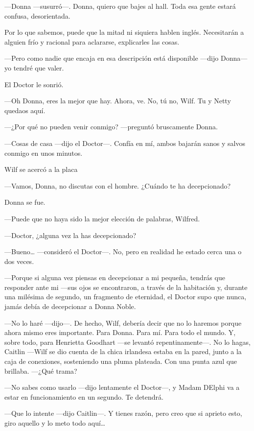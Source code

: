 ---Donna ---susurró---. Donna, quiero que bajes al hall. Toda esa gente
estará confusa, desorientada.

Por lo que sabemos, puede que la mitad ni siquiera hablen inglés.
Necesitarán a alguien frío y racional para aclararse, explicarles las
cosas.

---Pero como nadie que encaja en esa descripción está disponible ---dijo
Donna--- yo tendré que valer.

El Doctor le sonrió.

---Oh Donna, eres la mejor que hay. Ahora, ve. No, tú no, Wilf. Tu y
Netty quedaos aquí.

---¿Por qué no pueden venir conmigo? ---preguntó bruscamente Donna.

---Cosas de casa ---dijo el Doctor---. Confía en mí, ambos bajarán sanos
y salvos conmigo en unos minutos.

Wilf se acercó a la placa

---Vamos, Donna, no discutas con el hombre. ¿Cuándo te ha decepcionado?

Donna se fue.

---Puede que no haya sido la mejor elección de palabras, Wilfred.

---Doctor, ¿alguna vez la has decepcionado?

---Bueno\ldots{} ---consideró el Doctor---. No, pero en realidad he
estado cerca una o dos veces.

---Porque si alguna vez piensas en decepcionar a mi pequeña, tendrás que
responder ante mi ---sus ojos se encontraron, a través de la habitación
y, durante una milésima de segundo, un fragmento de eternidad, el Doctor
supo que nunca, jamás debía de decepcionar a Donna Noble.

---No lo haré ---dijo---. De hecho, Wilf, debería decir que no lo
haremos porque ahora mismo eres importante. Para Donna. Para mí. Para
todo el mundo. Y, sobre todo, para Henrietta Goodhart ---se levantó
repentinamente---. No lo hagas, Caitlin ---Wilf se dio cuenta de la
chica irlandesa estaba en la pared, junto a la caja de conexiones,
sosteniendo una pluma plateada. Con una punta azul que brillaba. ---¿Qué
trama?

---No sabes como usarlo ---dijo lentamente el Doctor---, y Madam DElphi
va a estar en funcionamiento en un segundo. Te detendrá.

---Que lo intente ---dijo Caitlin---. Y tienes razón, pero creo que si
aprieto esto, giro aquello y lo meto todo aquí\ldots{}

